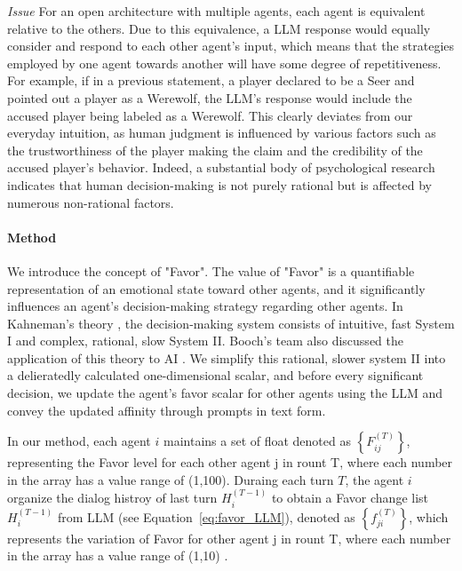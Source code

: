 \documentclass[11pt]{article}
\begin{document}
\textit{Issue} For an open architecture with multiple agents, each agent is equivalent relative to the others. Due to this equivalence, a LLM response would equally consider and respond to each other agent's input, which means that the strategies employed by one agent towards another will have some degree of repetitiveness.  For example, if in a previous statement, a player declared to be a Seer and pointed out a player as a Werewolf, the LLM's response would include the accused player being labeled as a Werewolf. This clearly deviates from our everyday intuition, as human judgment is influenced by various factors such as the trustworthiness of the player making the claim and the credibility of the accused player's behavior. Indeed, a substantial body of psychological research \citep{kahneman2013prospect,kahneman1982psychology,simon1991bounded,luhmann2018trust,cho2015survey} indicates that human decision-making is not purely rational but is affected by numerous non-rational factors.

\paragraph{Method} We introduce the concept of "Favor". The value of "Favor" is a quantifiable representation of an emotional state toward other agents, and it significantly influences an agent's decision-making strategy regarding other agents. In Kahneman's theory \citep{daniel2017thinking}, the decision-making system consists of intuitive, fast System I and complex, rational, slow System II. Booch's team also discussed the application of this theory to AI \citep{booch2021thinking}. We simplify this rational, slower system II into a delieratedly calculated one-dimensional scalar, and before every significant decision, we update the agent's favor scalar for other agents using the LLM and convey the updated affinity through prompts in text form.

In our method, each agent $ i $  maintains a set of float denoted as $ \left\{ F_{ij}^{(T)} \right\} $, representing the Favor level for each other agent j in rount T, where each number in the array has a value range of (1,100). Duraing each turn $ T $, the agent $ i $ organize the dialog histroy of last turn $ H_i^{(T-1)} $ to obtain a Favor change list $ H_i^{(T-1)} $ from LLM (see Equation~\ref{eq:favor_LLM}), denoted as $ \left\{ f_{ji}^{(T)} \right\} $, which represents the variation of Favor for other agent j in rount T, where each number in the array has a value range of (1,10) .
\end{document}
